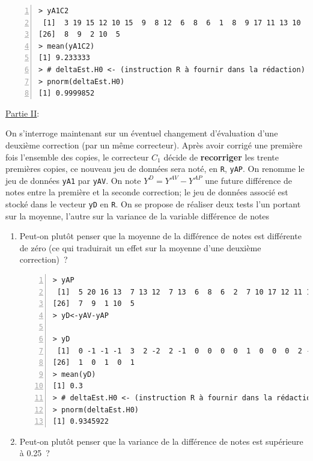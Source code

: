 \documentclass[10pt]{report}
\begin{document}
\begin{exercice}
\begin{enumerate}
\IndicR
\begin{Verbatim}[frame=leftline,fontfamily=tt,fontshape=n,numbers=left]
> yA1C2
 [1]  3 19 15 12 10 15  9  8 12  6  8  6  1  8  9 17 11 13 10  5  8  9 10 11  8
[26]  8  9  2 10  5
> mean(yA1C2)
[1] 9.233333
> # deltaEst.H0 <- (instruction R à fournir dans la rédaction)
> pnorm(deltaEst.H0)
[1] 0.9999852
\end{Verbatim}

 




\end{enumerate}

\noindent \underline{Partie II}:


On s'interroge maintenant sur un éventuel changement d'évaluation d'une deuxième correction (par un même correcteur). Après avoir corrigé une première fois l'ensemble des copies, le correcteur $C_1$ décide de \textbf{recorriger} les trente premières copies, ce nouveau jeu de données sera noté, en \texttt{R}, \texttt{yAP}. On renomme le jeu de données \texttt{yA1} par \texttt{yAV}. On note $Y^D=Y^{AV}-Y^{AP}$ une future différence de notes entre la première et la seconde correction; le jeu de données associé est stocké dans le vecteur \texttt{yD} en \texttt{R}. On se propose de réaliser deux tests l'un portant sur la moyenne, l'autre sur la variance de la variable différence de notes

\begin{enumerate}
\item Peut-on plutôt penser que la moyenne de la différence de notes est différente de zéro (ce qui traduirait un effet sur la moyenne d'une deuxième correction)~?

\IndicR
\begin{Verbatim}[frame=leftline,fontfamily=tt,fontshape=n,numbers=left]
> yAP
 [1]  5 20 16 13  7 13 12  7 13  6  8  6  2  7 10 17 12 11 12  6  9  8 10 12  7
[26]  7  9  1 10  5
> yD<-yAV-yAP

> yD
 [1]  0 -1 -1 -1  3  2 -2  2 -1  0  0  0  0  1  0  0  0  2 -1  0  0  1  1  0  1
[26]  1  0  1  0  1
> mean(yD)
[1] 0.3
> # deltaEst.H0 <- (instruction R à fournir dans la rédaction)
> pnorm(deltaEst.H0)
[1] 0.9345922
\end{Verbatim}

 



\item Peut-on plutôt penser que la variance de la différence de notes est supérieure à 0.25~?


\end{enumerate}
\end{exercice}
\end{document}
